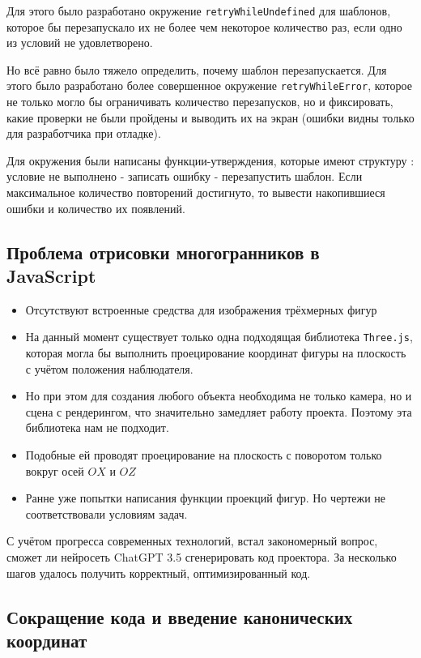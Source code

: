 \documentclass[a4paper, 12pt]{extarticle}
\begin{document}
Для этого было разработано окружение \texttt{retryWhileUndefined} для шаблонов, которое бы перезапускало их не более чем некоторое количество раз, если одно из условий не удовлетворено. 

Но всё равно было тяжело определить, почему шаблон перезапускается. Для этого было разработано более совершенное окружение \texttt{retryWhileError}, которое не только могло бы ограничивать количество перезапусков, но и фиксировать, какие проверки не были пройдены и выводить их на экран (ошибки видны только для разработчика при отладке).


Для окружения были написаны функции-утверждения, которые имеют структуру : условие не выполнено - записать ошибку - перезапустить шаблон. Если максимальное количество повторений достигнуто, то вывести накопившиеся ошибки и количество их появлений. 


\subsection*{Проблема отрисовки многогранников в JavaScript}

\begin{itemize}
	\item Отсутствуют встроенные средства для изображения трёхмерных фигур
	\item На данный момент существует только одна подходящая библиотека \texttt{Three.js}, которая могла бы выполнить проецирование координат фигуры на плоскость с учётом положения наблюдателя.
	\item Но при этом для создания любого объекта необходима не только камера, но и сцена с рендерингом, что значительно замедляет работу проекта. Поэтому эта библиотека нам не подходит.
	\item Подобные ей проводят проецирование на плоскость с поворотом только вокруг осей $OX$ и $OZ$
	\item Ранне уже попытки написания функции проекций фигур. Но чертежи не соответствовали условиям задач.
\end{itemize}

С учётом прогресса современных технологий, встал закономерный вопрос, сможет ли нейросеть ChatGPT 3.5 сгенерировать код проектора.
За несколько шагов удалось получить корректный, оптимизированный код.

\subsection*{Сокращение кода и введение канонических координат}
\end{document}
